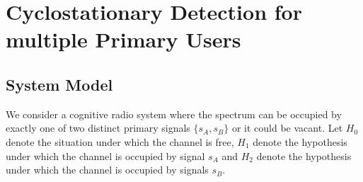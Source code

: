 \section{Cyclostationary Detection for multiple Primary Users}
\subsection{System Model}

We consider a cognitive radio system where the spectrum can be occupied by exactly one of two distinct primary signals $\{s_A, s_B\}$ or it could be vacant. Let $H_0$ denote the situation under which the channel is free, $H_1$ denote the hypothesis under which the channel is occupied by signal $s_A$ and $H_2$ denote the hypothesis under which the channel is occupied by signals $s_B$.  

